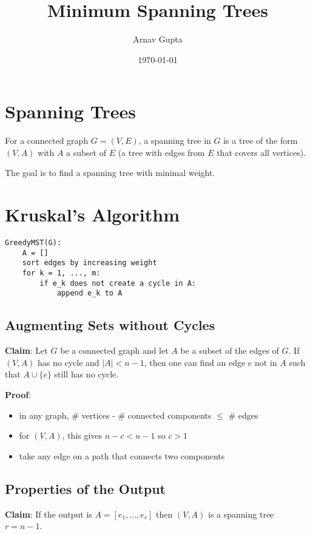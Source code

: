 \documentclass[11pt]{article}
\author{Arnav Gupta}
\date{\today}
\title{Minimum Spanning Trees}
\begin{document}
\maketitle
\tableofcontents

\section{Spanning Trees}
\label{sec:org8813c3c}
For a connected graph \(G = (V, E)\), a spanning tree in \(G\) is a tree of the form \((V, A)\)
with \(A\) a subset of \(E\) (a tree with edges from \(E\) that covers all vertices).

The goal is to find a spanning tree with minimal weight.
\section{Kruskal's Algorithm}
\label{sec:orgf6e6e37}
\begin{verbatim}
GreedyMST(G):
    A = []
    sort edges by increasing weight
    for k = 1, ..., m:
        if e_k does not create a cycle in A:
            append e_k to A
\end{verbatim}
\subsection{Augmenting Sets without Cycles}
\label{sec:org7b04a7e}
\textbf{Claim}: Let \(G\) be a connected graph and let \(A\) be a subset of the edges of \(G\).
If \((V, A)\) has no cycle and \(|A| < n - 1\), then one can find an edge \(e\) not in \(A\)
such that \(A \cup \{e\}\) still has no cycle.

\textbf{Proof}:
\begin{itemize}
\item in any graph, \# vertices - \# connected components \(\le\) \# edges
\item for \((V, A)\), this gives \(n - c < n - 1\) so \(c > 1\)
\item take any edge on a path that connects two components
\end{itemize}
\subsection{Properties of the Output}
\label{sec:org2f61793}
\textbf{Claim}: If the output is \(A = [e_{1}, \dots, e_{r}]\) then \((V, A)\) is a spanning tree
\(r = n - 1\).
\end{document}

